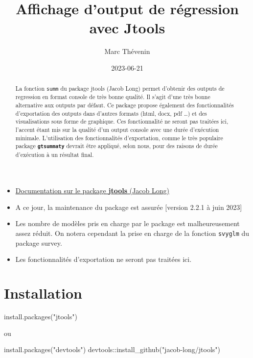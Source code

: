 \documentclass[
  letterpaper,
  DIV=11,
  numbers=noendperiod]{scrartcl}
\title{Affichage d'output de régression avec Jtools}
\author{Marc Thévenin}
\date{2023-06-21}
\newenvironment{Shaded}{\begin{snugshade}}{\end{snugshade}}
\newcommand{\FunctionTok}[1]{\textcolor[rgb]{0.31,0.98,0.48}{#1}}
\newcommand{\NormalTok}[1]{\textcolor[rgb]{0.97,0.97,0.95}{#1}}
\newcommand{\SpecialCharTok}[1]{\textcolor[rgb]{1.00,0.47,0.78}{#1}}
\newcommand{\StringTok}[1]{\textcolor[rgb]{0.95,0.98,0.55}{#1}}
\providecommand{\tightlist}{%
  \setlength{\itemsep}{0pt}\setlength{\parskip}{0pt}}\usepackage{longtable,booktabs,array}
\begin{document}
\maketitle
\begin{abstract}
La fonction \texttt{summ} du package jtools (Jacob Long) permet
d'obtenir des outputs de regression en format console de très bonne
qualité. Il s'agit d'une très bonne alternative aux outputs par défaut.
Ce package propose également des fonctionnalités d'exportation des
outputs dans d'autres formats (html, docx, pdf \ldots) et des
visualisations sous forme de graphique. Ces fonctionnalité ne seront pas
traitées ici, l'accent étant mis sur la qualité d'un output console avec
une durée d'exécution minimale. L'utilisation des fonctionnalités
d'exportation, comme le très populaire package
\textbf{\texttt{gtsummaty}} devrait être appliqué, selon nous, pour des
raisons de durée d'exécution à un résultat final.
\end{abstract}
\begin{itemize}
\tightlist
\item
  \href{https://jtools.jacob-long.com/index.html}{Documentation sur le
  package \textbf{jtools} (Jacob Long)}
\item
  A ce jour, la maintenance du package est assurée {[}version 2.2.1 à
  juin 2023{]}
\item
  Les nombre de modèles pris en charge par le package est
  malheureusement assez réduit. On notera cependant la prise en charge
  de la fonction \texttt{svyglm} du package survey.
\item
  Les fonctionnalités d'exportation ne seront pas traitées ici.
\end{itemize}

\hypertarget{installation}{%
\section{\texorpdfstring{\textbf{Installation}}{Installation}}\label{installation}}

\begin{Shaded}
\begin{Highlighting}[]
\FunctionTok{install.packages}\NormalTok{(}\StringTok{"jtools"}\NormalTok{)}
\end{Highlighting}
\end{Shaded}

ou

\begin{Shaded}
\begin{Highlighting}[]
\FunctionTok{install.packages}\NormalTok{(}\StringTok{"devtools"}\NormalTok{)}
\NormalTok{devtools}\SpecialCharTok{::}\FunctionTok{install\_github}\NormalTok{(}\StringTok{"jacob{-}long/jtools"}\NormalTok{)}
\end{Highlighting}
\end{Shaded}
\end{document}
